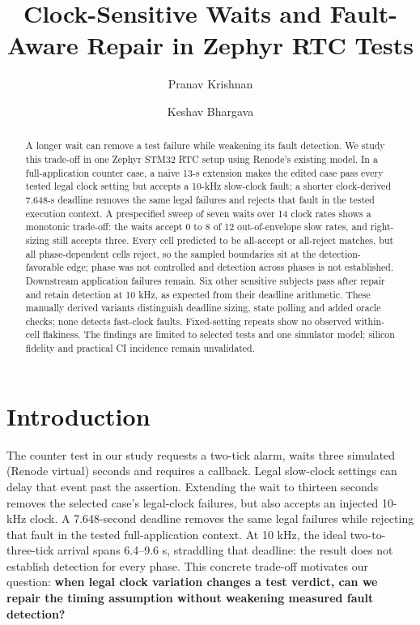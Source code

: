 \documentclass[sigconf,nonacm,balance=false]{acmart}
\begin{document}
\title[Clock-Sensitive Waits and Fault-Aware Repair]{Clock-Sensitive Waits and Fault-Aware Repair in Zephyr RTC Tests}
\author{Pranav Krishnan}
\author{Keshav Bhargava}

\begin{abstract}
A longer wait can remove a test failure while weakening its fault detection. We study this trade-off in one Zephyr STM32 RTC setup using Renode's existing model. In a full-application counter case, a naive 13-s extension makes the edited case pass every tested legal clock setting but accepts a 10-kHz slow-clock fault; a shorter clock-derived 7.648-s deadline removes the same legal failures and rejects that fault in the tested execution context. A prespecified sweep of seven waits over 14 clock rates shows a monotonic trade-off: the waits accept 0 to 8 of 12 out-of-envelope slow rates, and right-sizing still accepts three. Every cell predicted to be all-accept or all-reject matches, but all phase-dependent cells reject, so the sampled boundaries sit at the detection-favorable edge; phase was not controlled and detection across phases is not established. Downstream application failures remain. Six other sensitive subjects pass after repair and retain detection at 10 kHz, as expected from their deadline arithmetic. These manually derived variants distinguish deadline sizing, state polling and added oracle checks; none detects fast-clock faults. Fixed-setting repeats show no observed within-cell flakiness. The findings are limited to selected tests and one simulator model; silicon fidelity and practical CI incidence remain unvalidated.
\end{abstract}
\maketitle

\section{Introduction}
The counter test in our study requests a two-tick alarm, waits three simulated (Renode virtual) seconds and requires a callback. Legal slow-clock settings can delay that event past the assertion. Extending the wait to thirteen seconds removes the selected case's legal-clock failures, but also accepts an injected 10-kHz clock. A 7.648-second deadline removes the same legal failures while rejecting that fault in the tested full-application context. At 10 kHz, the ideal two-to-three-tick arrival spans 6.4--9.6 s, straddling that deadline: the result does not establish detection for every phase. This concrete trade-off motivates our question: \textbf{when legal clock variation changes a test verdict, can we repair the timing assumption without weakening measured fault detection?}
\end{document}
